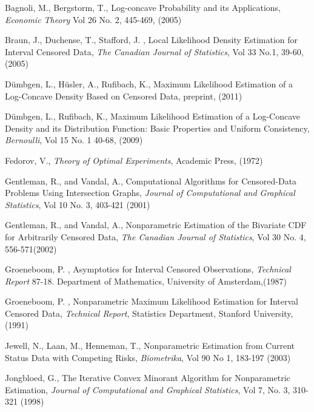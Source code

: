 \begin{thebibliography}{}
%
%
Bagnoli, M., Bergstorm, T., Log-concave Probability and its Applications, \emph{Economic Theory} Vol 26 No. 2, 445-469, (2005)

Braun, J., Duchense, T., Stafford, J. , Local Likelihood Density Estimation for Interval Censored Data, \emph{The Canadian Journal of Statistics}, Vol 33 No.1, 39-60,(2005)

D\"umbgen, L., H\"usler, A., Rufibach, K., Maximum Likelihood Estimation of a Log-Concave Density Based on Censored Data, preprint, (2011)

D\"umbgen, L., Rufibach, K., Maximum Likelihood Estimation of a Log-Concave Density and its Distribution Function: Basic Properties and Uniform Consistency, \emph{Bernoulli}, Vol 15 No. 1 40-68, (2009)

Fedorov, V., \emph{Theory of Optimal Experiments}, Academic Press, (1972) 

Gentleman, R., and Vandal, A., Computational Algorithms for Censored-Data Problems Using Intersection Graphs, \emph{Journal of Computational and Graphical Statistics}, Vol 10 No. 3, 403-421 (2001)


Gentleman, R., and Vandal, A., Nonparametric Estimation of the Bivariate CDF for Arbitrarily Censored Data, \emph{The Canadian Journal of Statistics}, Vol 30 No. 4, 556-571(2002)


Groeneboom, P. , Asymptotics for Interval Censored Observations, \emph{Technical Report} 87-18. Department of Mathematics, University of Amsterdam,(1987) 

Groeneboom, P. , Nonparametric Maximum Likelihood Estimation for Interval Censored Data, \emph{Technical Report}, Statistics Department, Stanford University,(1991)

Jewell, N., Laan, M., Henneman, T., Nonparametric Estimation from Current Status Data with Competing Risks, \emph{Biometrika}, Vol 90 No 1, 183-197 (2003)


Jongbloed, G., The Iterative Convex Minorant Algorithm for Nonparametric Estimation, \emph{Journal of Computational and Graphical Statistics}, Vol 7, No. 3, 310-321 (1998)


\end{thebibliography}
